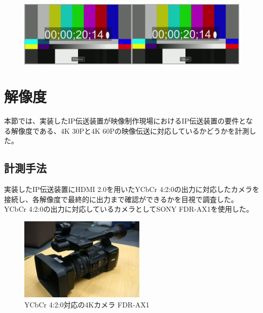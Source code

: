 \begin{figure}[htbp]
  \begin{center}
    \includegraphics[bb=0 0 1920 540,width=14cm]{img/evaluate-delay-hardware.png}
  \end{center}
  \caption[ハードウェア実装による遅延計測のキャプチャー画像]{}
  \label{fig:evaluate-delay-hardware}
\end{figure}

\newpage
\section{解像度}
本節では、実装したIP伝送装置が映像制作現場におけるIP伝送装置の要件となる解像度である、4K 30Pと4K 60Pの映像伝送に対応しているかどうかを計測した。

\subsection{計測手法}
実装したIP伝送装置にHDMI 2.0を用いたYCbCr 4:2:0の出力に対応したカメラを接続し、各解像度で最終的に出力まで確認ができるかを目視で調査した。
YCbCr 4:2:0の出力に対応しているカメラとしてSONY FDR-AX1を使用した。

\begin{figure}[htbp]
  \begin{center}
    \includegraphics[bb=0 0 1200 797,width=6cm]{img/DSC04116.JPG}
  \end{center}
  \caption{YCbCr 4:2:0対応の4Kカメラ FDR-AX1}
  \label{fig:fdr-ax1}
\end{figure}

